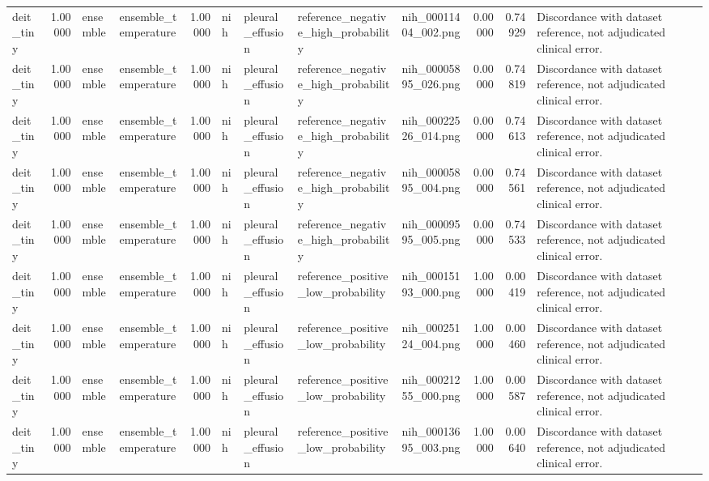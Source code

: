 \begin{tabular}{lrllrllllrrl}
deit\_tiny & 1.00000 & ensemble & ensemble\_temperature & 1.00000 & nih & pleural\_effusion & reference\_negative\_high\_probability & nih\_00011404\_002.png & 0.00000 & 0.74929 & Discordance with dataset reference, not adjudicated clinical error. \\
deit\_tiny & 1.00000 & ensemble & ensemble\_temperature & 1.00000 & nih & pleural\_effusion & reference\_negative\_high\_probability & nih\_00005895\_026.png & 0.00000 & 0.74819 & Discordance with dataset reference, not adjudicated clinical error. \\
deit\_tiny & 1.00000 & ensemble & ensemble\_temperature & 1.00000 & nih & pleural\_effusion & reference\_negative\_high\_probability & nih\_00022526\_014.png & 0.00000 & 0.74613 & Discordance with dataset reference, not adjudicated clinical error. \\
deit\_tiny & 1.00000 & ensemble & ensemble\_temperature & 1.00000 & nih & pleural\_effusion & reference\_negative\_high\_probability & nih\_00005895\_004.png & 0.00000 & 0.74561 & Discordance with dataset reference, not adjudicated clinical error. \\
deit\_tiny & 1.00000 & ensemble & ensemble\_temperature & 1.00000 & nih & pleural\_effusion & reference\_negative\_high\_probability & nih\_00009595\_005.png & 0.00000 & 0.74533 & Discordance with dataset reference, not adjudicated clinical error. \\
deit\_tiny & 1.00000 & ensemble & ensemble\_temperature & 1.00000 & nih & pleural\_effusion & reference\_positive\_low\_probability & nih\_00015193\_000.png & 1.00000 & 0.00419 & Discordance with dataset reference, not adjudicated clinical error. \\
deit\_tiny & 1.00000 & ensemble & ensemble\_temperature & 1.00000 & nih & pleural\_effusion & reference\_positive\_low\_probability & nih\_00025124\_004.png & 1.00000 & 0.00460 & Discordance with dataset reference, not adjudicated clinical error. \\
deit\_tiny & 1.00000 & ensemble & ensemble\_temperature & 1.00000 & nih & pleural\_effusion & reference\_positive\_low\_probability & nih\_00021255\_000.png & 1.00000 & 0.00587 & Discordance with dataset reference, not adjudicated clinical error. \\
deit\_tiny & 1.00000 & ensemble & ensemble\_temperature & 1.00000 & nih & pleural\_effusion & reference\_positive\_low\_probability & nih\_00013695\_003.png & 1.00000 & 0.00640 & Discordance with dataset reference, not adjudicated clinical error. \\

\end{tabular}
